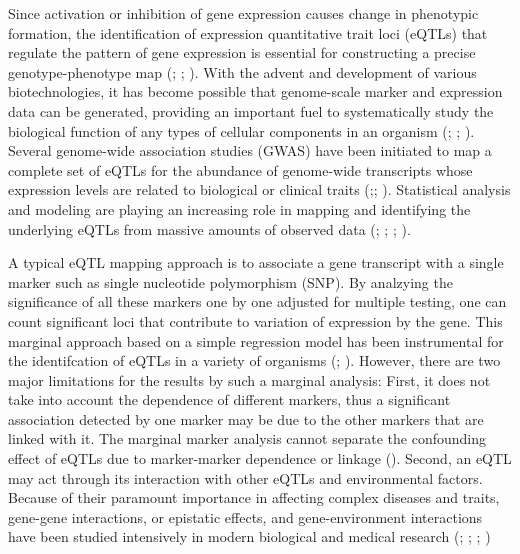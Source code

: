 \documentclass[11pt,]{book}
\theoremstyle{definition}
\theoremstyle{definition}
\theoremstyle{remark}
\begin{document}
Since activation or inhibition of gene expression causes change in
phenotypic formation, the identification of expression quantitative
trait loci (eQTLs) that regulate the pattern of gene expression is
essential for constructing a precise genotype-phenotype map
(\cite{emilsson2008genetics}; \cite{cookson2009mapping};
\cite{nica2013expression}). With the advent and development of various
biotechnologies, it has become possible that genome-scale marker and
expression data can be generated, providing an important fuel to
systematically study the biological function of any types of cellular
components in an organism (\cite{kim2014meta}; \cite{fairfax2014innate};
\cite{lee2014common}). Several genome-wide association studies (GWAS)
have been initiated to map a complete set of eQTLs for the abundance of
genome-wide transcripts whose expression levels are related to
biological or clinical traits
(\cite{nica2013expression};\cite{li2013using};
\cite{koopmann2014genome}). Statistical analysis and modeling are
playing an increasing role in mapping and identifying the underlying
eQTLs from massive amounts of observed data
(\cite{kendziorski2006statistical}; \cite{chun2009expression};
\cite{sun2012statistical}; \cite{flutre2013statistical}).

A typical eQTL mapping approach is to associate a gene transcript with a
single marker such as single nucleotide polymorphism (SNP). By analzying
the significance of all these markers one by one adjusted for multiple
testing, one can count significant loci that contribute to variation of
expression by the gene. This marginal approach based on a simple
regression model has been instrumental for the identifcation of eQTLs in
a variety of organisms (\cite{rockman2010selection};
\cite{kim2014meta}). However, there are two major limitations for the
results by such a marginal analysis: First, it does not take into
account the dependence of different markers, thus a significant
association detected by one marker may be due to the other markers that
are linked with it. The marginal marker analysis cannot separate the
confounding effect of eQTLs due to marker-marker dependence or linkage
(\cite{wu2007statistical}). Second, an eQTL may act through its
interaction with other eQTLs and environmental factors. Because of their
paramount importance in affecting complex diseases and traits, gene-gene
interactions, or epistatic effects, and gene-environment interactions
have been studied intensively in modern biological and medical research
(\cite{cheverud1995epistasis}; \cite{moore2003ubiquitous};
\cite{van2010detection}; \cite{mackay2014epistasis})
\end{document}
